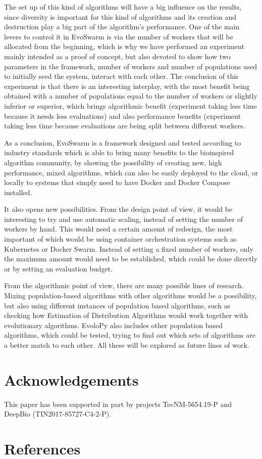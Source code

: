 \documentclass[review]{elsarticle}
\begin{document}
The set up of this kind of algorithms will have a big influence on the
results, since diversity is important for this kind of algorithms and
its creation and destruction play a big part of the algorithm's
performance. One of the main levers to control it in EvoSwarm is via
the number of workers that will be allocated from the beginning, which
is why we have performed an experiment mainly intended as a proof of
concept, but also devoted to show how two parameters in the framework,
number of workers and number of populations used to initially seed the
system, interact with each other. The conclusion of this experiment is
that there is an interesting interplay, with the most benefit being
obtained with a number of populations equal to the number of workers
or slightly inferior or superior, which brings algorithmic benefit
(experiment taking less time because it needs less evaluations) and
also performance benefits (experiment taking less time because
evaluations are being split between different workers.

As a conclusion, EvoSwarm is a framework designed and tested according
to industry standards which is able to bring many benefits to the
bioinspired algorithm community, by showing the possibility of
creating new, high performance, mixed algorithms, which can also be
easily deployed to the cloud, or locally to systems that simply need
to have Docker and Docker Compose installed.

It also opens new possibilities. From the design point of view, it
would be interesting to try and use automatic scaling, instead of
setting the number of workers by hand. This would need a certain
amount of redesign, the most important of which would be using
container orchestration systems such as Kubernetes or Docker
Swarm. Instead of setting a fixed number of workers, only the maximum
amount would need to be established, which could be done directly or
by setting an evaluation budget.

From the algorithmic point of view, there are many possible lines of
research. Mixing population-based algorithms with other algorithms
would be a possibility, but also using different instances of
population based algorithms, such as checking how Estimation of
Distribution Algorithms would work together with evolutionary
algorithms. EvoloPy also includes other population based algorithms,
which could be tested, trying to find out which sets of algorithms are
a better match to each other. All these will be explored as future
lines of work.

\section{Acknowledgements}

This paper has been supported in part by projects TecNM-5654.19-P and DeepBio
(TIN2017-85727-C4-2-P).

\section*{References}



\end{document}
